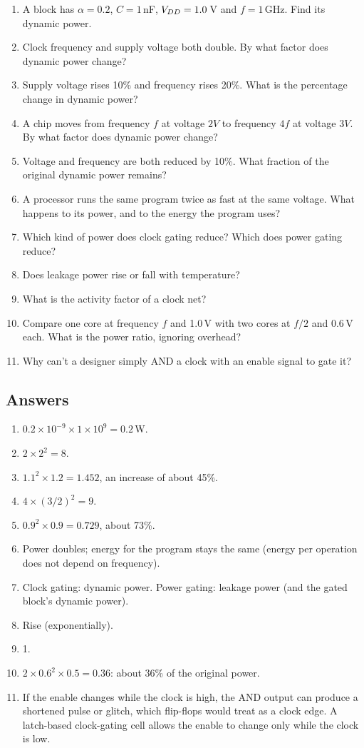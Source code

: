 \begin{enumerate}
  \item A block has $\alpha = 0.2$, $C = 1$\,nF, $V_{DD} = 1.0$\,V and $f = 1$\,GHz. Find its dynamic power.
  \item Clock frequency and supply voltage both double. By what factor does dynamic power change?
  \item Supply voltage rises 10\% and frequency rises 20\%. What is the percentage change in dynamic power?
  \item A chip moves from frequency $f$ at voltage $2V$ to frequency $4f$ at voltage $3V$. By what factor does dynamic power change?
  \item Voltage and frequency are both reduced by 10\%. What fraction of the original dynamic power remains?
  \item A processor runs the same program twice as fast at the same voltage. What happens to its power, and to the energy the program uses?
  \item Which kind of power does clock gating reduce? Which does power gating reduce?
  \item Does leakage power rise or fall with temperature?
  \item What is the activity factor of a clock net?
  \item Compare one core at frequency $f$ and 1.0\,V with two cores at $f/2$ and 0.6\,V each. What is the power ratio, ignoring overhead?
  \item Why can't a designer simply AND a clock with an enable signal to gate it?
\end{enumerate}

\subsection*{Answers}
\begin{enumerate}
  \item $0.2 \times 10^{-9} \times 1 \times 10^9 = 0.2$\,W.
  \item $2 \times 2^2 = 8$.
  \item $1.1^2 \times 1.2 = 1.452$, an increase of about 45\%.
  \item $4 \times (3/2)^2 = 9$.
  \item $0.9^2 \times 0.9 = 0.729$, about 73\%.
  \item Power doubles; energy for the program stays the same (energy per operation does not depend on frequency).
  \item Clock gating: dynamic power. Power gating: leakage power (and the gated block's dynamic power).
  \item Rise (exponentially).
  \item 1.
  \item $2 \times 0.6^2 \times 0.5 = 0.36$: about 36\% of the original power.
  \item If the enable changes while the clock is high, the AND output can produce a shortened pulse or glitch, which flip-flops would treat as a clock edge. A latch-based clock-gating cell allows the enable to change only while the clock is low.
\end{enumerate}
